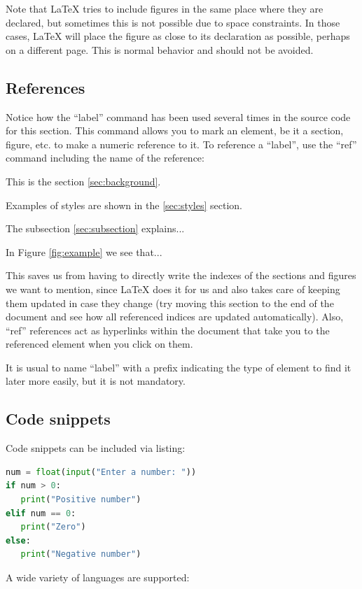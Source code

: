 Note that LaTeX tries to include figures in the same place where they are declared, but sometimes this is not possible due to space constraints. In those cases, LaTeX will place the figure as close to its declaration as possible, perhaps on a different page. This is normal behavior and should not be avoided.

\subsection{References}
Notice how the ``label'' command has been used several times in the source code for this section. This command allows you to mark an element, be it a section, figure, etc. to make a numeric reference to it. To reference a ``label'', use the ``ref'' command including the name of the reference:

This is the section \ref{sec:background}.

Examples of styles are shown in the \ref{sec:styles} section.

The subsection \ref{sec:subsection} explains...

In Figure \ref{fig:example} we see that...

This saves us from having to directly write the indexes of the sections and figures we want to mention, since LaTeX does it for us and also takes care of keeping them updated in case they change (try moving this section to the end of the document and see how all referenced indices are updated automatically). Also, ``ref'' references act as hyperlinks within the document that take you to the referenced element when you click on them.

It is usual to name ``label'' with a prefix indicating the type of element to find it later more easily, but it is not mandatory.

\subsection{Code snippets}

Code snippets can be included via listing:

\begin{lstlisting}[language=Python, caption={Python code}, label={cod:python}, captionpos=b]
num = float(input("Enter a number: "))
if num > 0:
   print("Positive number")
elif num == 0:
   print("Zero")
else:
   print("Negative number")
\end{lstlisting}

A wide variety of languages are supported:

